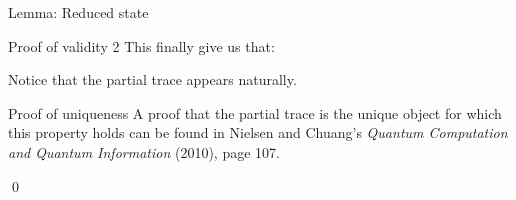 \documentclass[a4paper]{article}
\begin{document}
\begin{parag}{Lemma: Reduced state}
\begin{subparag}{Proof of validity 2}
        This finally give us that: 

        Notice that the partial trace appears naturally.
    \end{subparag}

    \begin{subparag}{Proof of uniqueness}
        A proof that the partial trace is the unique object for which this property holds can be found in Nielsen and Chuang's \textit{Quantum Computation and Quantum Information} (2010), page 107.

        \qed
    \end{subparag}
\end{parag}
\end{document}
